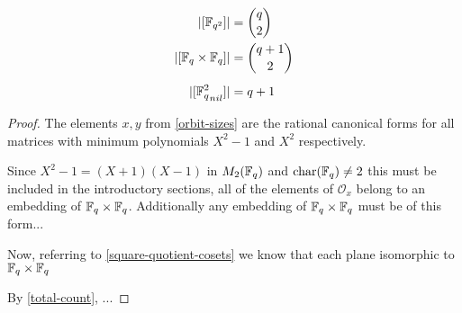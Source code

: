 \documentclass{amsart}
\begin{document}
\begin{theorem}
    \begin{align}
        |[\protect\mathbb{F}_{q^2}]|                  &= \binom{q}{2} \\
        |[\protect\mathbb{F}_q \times \protect\mathbb{F}_q]|         &= \binom{q + 1}{2} \\[0.5em]
        |[{\protect\mathbb{F}_q^2}_{nil}]|            &= q + 1
    \end{align}
\end{theorem}
\begin{proof}
The elements $x, y$ from \cref{orbit-sizes} are the rational canonical forms for all matrices with minimum polynomials $X^2 - 1$ and $X^2$ respectively. 

Since $X^2 - 1 = (X + 1)(X - 1)$ in $M_2(\protect\mathbb{F}_q)$ and $\operatorname{char}(\protect\mathbb{F}_q) \neq 2$ {\color{blue} this must be included in the introductory sections}, all of the elements of $\mathcal{O}_x$ belong to an embedding of $\protect\mathbb{F}_q \times \protect\mathbb{F}_q$. Additionally any embedding of $\protect\mathbb{F}_q \times \protect\mathbb{F}_q$ must be of this form...

Now, referring to \cref{square-quotient-cosets} we know that each plane isomorphic to $\protect\mathbb{F}_q \times \protect\mathbb{F}_q$

By \cref{total-count}, ...
\end{proof}

\begin{bibdiv}
    \begin{biblist}
    \end{biblist}
\end{bibdiv}
\end{document}
